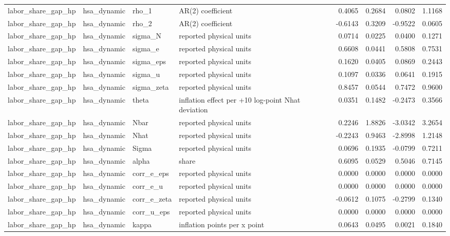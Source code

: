 \begin{tabular}{llllrrrr}
labor\_share\_gap\_hp & hsa\_dynamic & rho\_1 & AR(2) coefficient & 0.4065 & 0.2684 & 0.0802 & 1.1168 \\
labor\_share\_gap\_hp & hsa\_dynamic & rho\_2 & AR(2) coefficient & -0.6143 & 0.3209 & -0.9522 & 0.0605 \\
labor\_share\_gap\_hp & hsa\_dynamic & sigma\_N & reported physical units & 0.0714 & 0.0225 & 0.0400 & 0.1271 \\
labor\_share\_gap\_hp & hsa\_dynamic & sigma\_e & reported physical units & 0.6608 & 0.0441 & 0.5808 & 0.7531 \\
labor\_share\_gap\_hp & hsa\_dynamic & sigma\_eps & reported physical units & 0.1620 & 0.0405 & 0.0869 & 0.2443 \\
labor\_share\_gap\_hp & hsa\_dynamic & sigma\_u & reported physical units & 0.1097 & 0.0336 & 0.0641 & 0.1915 \\
labor\_share\_gap\_hp & hsa\_dynamic & sigma\_zeta & reported physical units & 0.8457 & 0.0544 & 0.7472 & 0.9600 \\
labor\_share\_gap\_hp & hsa\_dynamic & theta & inflation effect per +10 log-point Nhat deviation & 0.0351 & 0.1482 & -0.2473 & 0.3566 \\
labor\_share\_gap\_hp & hsa\_dynamic & Nbar & reported physical units & 0.2246 & 1.8826 & -3.0342 & 3.2654 \\
labor\_share\_gap\_hp & hsa\_dynamic & Nhat & reported physical units & -0.2243 & 0.9463 & -2.8998 & 1.2148 \\
labor\_share\_gap\_hp & hsa\_dynamic & Sigma & reported physical units & 0.0696 & 0.1935 & -0.0799 & 0.7211 \\
labor\_share\_gap\_hp & hsa\_dynamic & alpha & share & 0.6095 & 0.0529 & 0.5046 & 0.7145 \\
labor\_share\_gap\_hp & hsa\_dynamic & corr\_e\_eps & reported physical units & 0.0000 & 0.0000 & 0.0000 & 0.0000 \\
labor\_share\_gap\_hp & hsa\_dynamic & corr\_e\_u & reported physical units & 0.0000 & 0.0000 & 0.0000 & 0.0000 \\
labor\_share\_gap\_hp & hsa\_dynamic & corr\_e\_zeta & reported physical units & -0.0612 & 0.1075 & -0.2799 & 0.1340 \\
labor\_share\_gap\_hp & hsa\_dynamic & corr\_u\_eps & reported physical units & 0.0000 & 0.0000 & 0.0000 & 0.0000 \\
labor\_share\_gap\_hp & hsa\_dynamic & kappa & inflation points per x point & 0.0643 & 0.0495 & 0.0021 & 0.1840 \\

\end{tabular}
